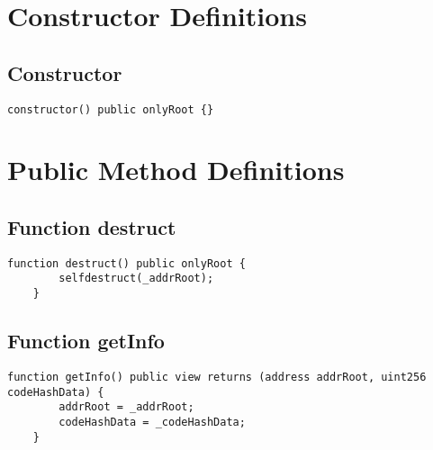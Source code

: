 \section{Constructor Definitions}


\subsection{Constructor}

\begin{lstlisting}[firstnumber=16]
    constructor() public onlyRoot {}
\end{lstlisting}

\section{Public Method Definitions}


\subsection{Function destruct}


\begin{lstlisting}[firstnumber=23]
    function destruct() public onlyRoot {
        selfdestruct(_addrRoot);
    }
\end{lstlisting}

\subsection{Function getInfo}

\begin{lstlisting}[firstnumber=18]
    function getInfo() public view returns (address addrRoot, uint256 codeHashData) {
        addrRoot = _addrRoot;
        codeHashData = _codeHashData;
    }
\end{lstlisting}
